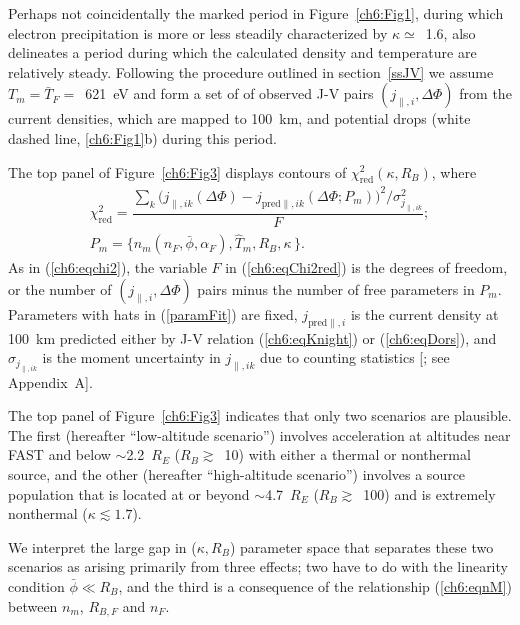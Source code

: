 
  Perhaps not coincidentally the marked period in Figure~\ref{ch6:Fig1}, during
  which electron precipitation is more or less steadily characterized by
  $\kappa \simeq$~1.6, also delineates a period during which the calculated
  density and temperature are relatively steady. Following the procedure
  outlined in section~\ref{ssJV} we assume $T_m = \bar{T}_F =$~621~eV and form a
  set of of observed J-V pairs $( j_{\parallel,i} , \Delta \Phi )$ from the
  current densities, which are mapped to 100~km, and potential drops (white
  dashed line, \ref{ch6:Fig1}b) during this period.

  The top panel of Figure~\ref{ch6:Fig3} displays contours of
  $\chi^2_{\textrm{red}} ( \kappa, R_B )$, where
  \begin{subequations}
    \begin{align} \chi^2_{\mathrm{red}} = \dfrac{\sum_k \Big ( j_{\parallel,i k} (\Delta \Phi) - j_{\textrm{pred}\parallel,i k}(\Delta \Phi; P_m) \Big )^2 \Big / \sigma_{j_{\parallel,i k}}^2}{F}; \label{ch6:eqChi2red} \\
      P_m = \Big \{ n_m ( \hat{n}_F, \bar{\phi} , \alpha_F ), \hat{T}_m, R_B,
      \kappa \, \Big \}. \label{paramFit}
    \end{align}
  \end{subequations}
  As in (\ref{ch6:eqchi2}), the variable $F$ in (\ref{ch6:eqChi2red}) is the
  degrees of freedom, or the number of $( j_{\parallel,i} , \Delta \Phi )$ pairs
  minus the number of free parameters in $P_m$. Parameters with hats in
  (\ref{paramFit}) are fixed, $j_{\textrm{pred}\parallel,i} $ is the current
  density at 100~km predicted either by J-V relation (\ref{ch6:eqKnight}) or
  (\ref{ch6:eqDors}), and $\sigma_{j_{\parallel,i k}}$ is the moment uncertainty
  in $j_{\parallel,i k}$ due to counting statistics [\citealp{Gershman2015}; see
  Appendix~A].

  The top panel of Figure~\ref{ch6:Fig3} indicates that only two scenarios are
  plausible. The first (hereafter ``low-altitude scenario'') involves
  acceleration at altitudes near FAST and below $\sim$2.2~$R_E$
  ($R_B \gtrsim$~10) with either a thermal or nonthermal source, and the other
  (hereafter ``high-altitude scenario'') involves a source population that is
  located at or beyond $\sim$4.7~$R_E$ ($R_B \gtrsim$~100) and is extremely
  nonthermal ($\kappa \lesssim 1.7$).

  We interpret the large gap in ($\kappa, R_B$) parameter space that separates
  these two scenarios as arising primarily from three effects; two have to do
  with the linearity condition $\bar{\phi} \ll R_B $, and the third is a
  consequence of the relationship (\ref{ch6:eqnM}) between $n_m$, $R_{B,F}$ and
  $n_F$.

